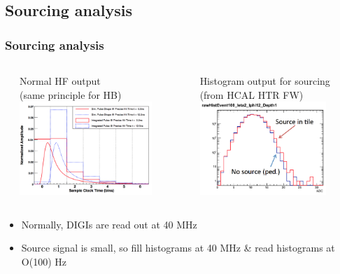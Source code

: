 \documentclass[bigger]{beamer}
\begin{document}
\subsection{Sourcing analysis}
\label{sec-2-2}
\begin{frame}
\frametitle{Sourcing analysis}
\label{sec-2-2-1}
\begin{columns} %
\label{sec-2-2-1-1}
\begin{column}{0.55\textwidth}
\label{sec-2-2-1-1-1}

\centering
Normal HF output \\(same principle for HB)
\includegraphics[width=0.8\textwidth]{fig/sourcing/sourcing_explain_1.png}
\end{column}
\begin{column}{0.55\textwidth}
\label{sec-2-2-1-1-2}

\centering
Histogram output for sourcing \\(from HCAL HTR FW)
\includegraphics[width=0.8\textwidth]{fig/sourcing/sourcing_explain_2.png}
\end{column}
\end{columns}
\begin{itemize}

\item Normally, DIGIs are read out at 40 MHz
\label{sec-2-2-1-2}%

\item Source signal is small, so fill histograms at 40 MHz \& read histograms at O(100) Hz
\label{sec-2-2-1-3}%
\end{itemize} %
\end{frame}
\end{document}

